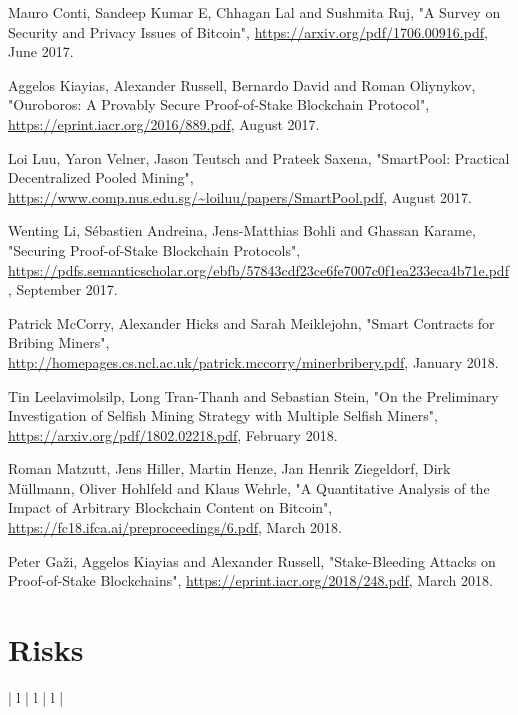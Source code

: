 \documentclass[11pt,a4paper]{article}
\begin{document}
\begin{itemize}
\begin{itemize}
\begin{thebibliography}{9}
Mauro Conti, Sandeep Kumar E, Chhagan Lal and Sushmita Ruj,
"A Survey on Security and Privacy Issues of Bitcoin",
\url{https://arxiv.org/pdf/1706.00916.pdf},
June 2017.

Aggelos Kiayias, Alexander Russell, Bernardo David and Roman Oliynykov,
"Ouroboros: A Provably Secure Proof-of-Stake Blockchain Protocol",
\url{https://eprint.iacr.org/2016/889.pdf},
August 2017.

Loi Luu, Yaron Velner, Jason Teutsch and Prateek Saxena,
"SmartPool: Practical Decentralized Pooled Mining",
\url{https://www.comp.nus.edu.sg/~loiluu/papers/SmartPool.pdf},
August 2017.

Wenting Li, Sébastien Andreina, Jens-Matthias Bohli and Ghassan Karame,
"Securing Proof-of-Stake Blockchain Protocols",
\url{https://pdfs.semanticscholar.org/ebfb/57843cdf23ce6fe7007c0f1ea233eca4b71e.pdf},
September 2017.

Patrick McCorry, Alexander Hicks and Sarah Meiklejohn,
"Smart Contracts for Bribing Miners",
\url{http://homepages.cs.ncl.ac.uk/patrick.mccorry/minerbribery.pdf},
January 2018.

Tin Leelavimolsilp, Long Tran-Thanh and Sebastian Stein,
"On the Preliminary Investigation of Selfish Mining Strategy with Multiple Selfish Miners",
\url{https://arxiv.org/pdf/1802.02218.pdf},
February 2018.

Roman Matzutt, Jens Hiller, Martin Henze, Jan Henrik Ziegeldorf, Dirk Müllmann, Oliver Hohlfeld and Klaus Wehrle,
"A Quantitative Analysis of the Impact of Arbitrary Blockchain Content on Bitcoin",
\url{https://fc18.ifca.ai/preproceedings/6.pdf},
March 2018.

Peter Gaži, Aggelos Kiayias and Alexander Russell,
"Stake-Bleeding Attacks on Proof-of-Stake Blockchains",
\url{https://eprint.iacr.org/2018/248.pdf},
March 2018.

\end{thebibliography}

\newpage
\appendix

\section{Risks}

\begin{tabular}{| l | l | l |}
  \hline

  \\
  \hline


\end{tabular}
\end{itemize}
\end{itemize}
\end{document}
